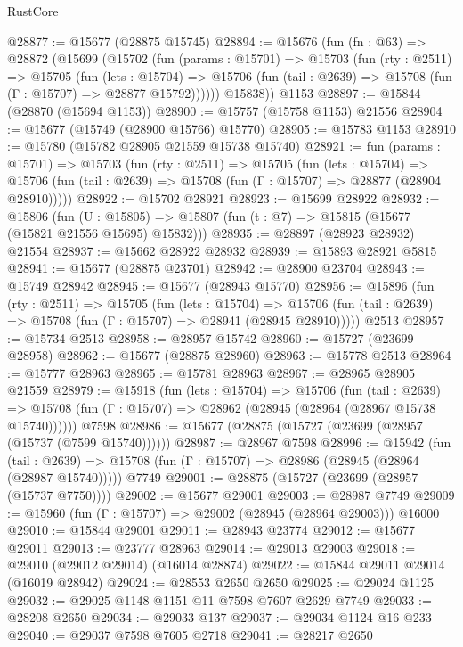 \begin{lexlean}{RustCore}
\begin{coremodule}
@28877 := @15677 (@28875 @15745)
@28894 := @15676
    (fun (fn : @63) =>
    @28872
      (@15699
        (@15702
          (fun (params : @15701) =>
          @15703
            (fun (rty : @2511) =>
            @15705
              (fun (lets : @15704) =>
              @15706 (fun (tail : @2639) => @15708 (fun (Γ : @15707) => @28877 @15792))))))
        @15838))
    @1153
@28897 := @15844 (@28870 (@15694 @1153))
@28900 := @15757 (@15758 @1153) @21556
@28904 := @15677 (@15749 (@28900 @15766) @15770)
@28905 := @15783 @1153
@28910 := @15780 (@15782 @28905 @21559 @15738 @15740)
@28921 := fun (params : @15701) =>
  @15703
    (fun (rty : @2511) =>
    @15705
      (fun (lets : @15704) =>
      @15706 (fun (tail : @2639) => @15708 (fun (Γ : @15707) => @28877 (@28904 @28910)))))
@28922 := @15702 @28921
@28923 := @15699 @28922
@28932 := @15806
    (fun (U : @15805) => @15807 (fun (t : @7) => @15815 (@15677 (@15821 @21556 @15695) @15832)))
@28935 := @28897 (@28923 @28932) @21554
@28937 := @15662 @28922 @28932
@28939 := @15893 @28921 @5815
@28941 := @15677 (@28875 @23701)
@28942 := @28900 @23704
@28943 := @15749 @28942
@28945 := @15677 (@28943 @15770)
@28956 := @15896
    (fun (rty : @2511) =>
    @15705
      (fun (lets : @15704) =>
      @15706 (fun (tail : @2639) => @15708 (fun (Γ : @15707) => @28941 (@28945 @28910)))))
    @2513
@28957 := @15734 @2513
@28958 := @28957 @15742
@28960 := @15727 (@23699 @28958)
@28962 := @15677 (@28875 @28960)
@28963 := @15778 @2513
@28964 := @15777 @28963
@28965 := @15781 @28963
@28967 := @28965 @28905 @21559
@28979 := @15918
    (fun (lets : @15704) =>
    @15706
      (fun (tail : @2639) =>
      @15708 (fun (Γ : @15707) => @28962 (@28945 (@28964 (@28967 @15738 @15740))))))
    @7598
@28986 := @15677 (@28875 (@15727 (@23699 (@28957 (@15737 (@7599 @15740))))))
@28987 := @28967 @7598
@28996 := @15942
    (fun (tail : @2639) => @15708 (fun (Γ : @15707) => @28986 (@28945 (@28964 (@28987 @15740)))))
    @7749
@29001 := @28875 (@15727 (@23699 (@28957 (@15737 @7750))))
@29002 := @15677 @29001
@29003 := @28987 @7749
@29009 := @15960 (fun (Γ : @15707) => @29002 (@28945 (@28964 @29003))) @16000
@29010 := @15844 @29001
@29011 := @28943 @23774
@29012 := @15677 @29011
@29013 := @23777 @28963
@29014 := @29013 @29003
@29018 := @29010 (@29012 @29014) (@16014 @28874)
@29022 := @15844 @29011 @29014 (@16019 @28942)
@29024 := @28553 @2650 @2650
@29025 := @29024 @1125
@29032 := @29025 @1148 @1151 @11 @7598 @7607 @2629 @7749
@29033 := @28208 @2650
@29034 := @29033 @137
@29037 := @29034 @1124 @16 @233
@29040 := @29037 @7598 @7605 @2718
@29041 := @28217 @2650

\end{coremodule}
\end{lexlean}
